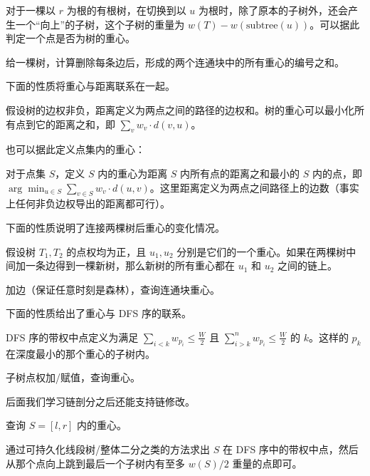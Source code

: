 对于一棵以 $r$ 为根的有根树，在切换到以 $u$ 为根时，除了原本的子树外，还会产生一个“向上”的子树，这个子树的重量为 $w(T)-w(\mathrm{subtree}(u))$。可以据此判定一个点是否为树的重心。
\begin{exercise}[P5666]
    给一棵树，计算删除每条边后，形成的两个连通块中的所有重心的编号之和。
\end{exercise}

下面的性质将重心与距离联系在一起。
\begin{property}
    假设树的边权非负，距离定义为两点之间的路径的边权和。树的重心可以最小化所有点到它的距离之和，即 $\sum_v w_v \cdot d(v, u)$。
\end{property}
也可以据此定义点集内的重心：
\begin{definition}
    对于点集 $S$，定义 $S$ 内的重心为距离 $S$ 内所有点的距离之和最小的 $S$ 内的点，即 $\arg\min_{u \in S} \sum_{v \in S} w_v \cdot d(u, v)$。这里距离定义为两点之间路径上的边数（事实上任何非负边权导出的距离都可行）。
\end{definition}



下面的性质说明了连接两棵树后重心的变化情况。
\begin{property}
    假设树 $T_1,T_2$ 的点权均为正，且 $u_1,u_2$ 分别是它们的一个重心。如果在两棵树中间加一条边得到一棵新树，那么新树的所有重心都在 $u_1$ 和 $u_2$ 之间的链上。
\end{property}
\begin{example}[P4299]
    加边（保证任意时刻是森林），查询连通块重心。
\end{example}

下面的性质给出了重心与 DFS 序的联系。
\begin{property}
    DFS 序的带权中点定义为满足 $\sum_{i<k} w_{p_i} \le \frac{W}{2}$ 且 $\sum_{i>k}^n w_{p_i} \le \frac{W}{2}$ 的 $k$。这样的 $p_k$ 在深度最小的那个重心的子树内。
\end{property}
\begin{exercise}
    子树点权加/赋值，查询重心。
\end{exercise}
\begin{remark}
    后面我们学习链剖分之后还能支持链修改。
\end{remark}
\begin{exercise}
    查询 $S=[l,r]$ 内的重心。
\end{exercise}
\begin{solution}
    通过可持久化线段树/整体二分之类的方法求出 $S$ 在 DFS 序中的带权中点，然后从那个点向上跳到最后一个子树内有至多 $w(S)/2$ 重量的点即可。
\end{solution}

